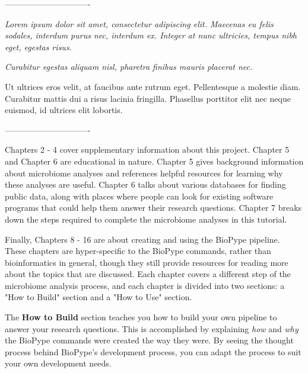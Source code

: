 ------------------------------- 

 \textit{Lorem ipsum dolor sit amet, consectetur adipiscing elit. Maecenas eu felis sodales, interdum purus nec, interdum ex. Integer at nunc ultricies, tempus nibh eget, egestas risus.}

\vspace{8mm}

\textit{Curabitur egestas aliquam nisl, pharetra finibus mauris placerat nec.}

 Ut ultrices eros velit, at faucibus ante rutrum eget. Pellentesque a molestie diam. Curabitur mattis dui a risus lacinia fringilla. Phasellus porttitor elit nec neque euismod, id ultrices elit lobortis. 

------------------------------- 

Chapters 2 - 4 cover supplementary information about this project. Chapter 5 and Chapter 6 are educational in nature. Chapter 5 gives background information about microbiome analyses and references helpful resources for learning why these analyses are useful. Chapter 6 talks about various databases for finding public data, along with places where people can look for existing software programs that could help them answer their research questions. Chapter 7 breaks down the steps required to complete the microbiome analyses in this tutorial. 

Finally, Chapters 8 - 16 are about creating and using the BioPype pipeline. These chapters are hyper-specific to the BioPype commands, rather than bioinformatics in general, though they still provide resources for reading more about the topics that are discussed. Each chapter covers a different step of the microbiome analysis process, and each chapter is divided into two sections: a "How to Build" section and a "How to Use" section. 

The \textbf{How to Build} section teaches you how to build your own pipeline to answer your research questions. This is accomplished by explaining \textit{how} and \textit{why} the BioPype commands were created the way they were. By seeing the thought process behind BioPype's development process, you can adapt the process to suit your own development needs.

